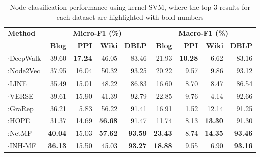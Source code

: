 \documentclass[conference]{IEEEtran}
\begin{document}
\begin{table*}[t]\small \vspace{-4pt}
\caption{Node classification performance using kernel SVM, where the top-3 results for each dataset are highlighted with bold numbers
}
\label{tbl:classifkern}
\centering
\vspace{-4pt}
\begin{tabular}{l|rrrr|rrrr}
\hline
\multirow{2}{*}{\textbf{Method}} & \multicolumn{4}{c|}{\textbf{Micro-F1 (\%)}}                                                 & \multicolumn{4}{c}{\textbf{Macro-F1 (\%)}}                                                  \\ \cline{2-9}  & \textbf{Blog}    & \textbf{PPI}            & \textbf{Wiki}           & \textbf{DBLP}           & \textbf{Blog}    & \textbf{PPI}            & \textbf{Wiki}           & \textbf{DBLP}           \\ \hline
$\cdot$DeepWalk                 & 39.60          & \textbf{17.24} & 46.05          & 83.46          & 21.93          & \textbf{10.28} & 6.62           & 83.16          \\
:Node2Vec                 & 37.95          & 16.04          & 50.32          & 93.25          & 20.22          & 9.57           & 9.86           & 93.12          \\
$\cdot$LINE                     & 35.49          & 15.01          & 48.22          & 86.83          & 16.60          & 8.70           & 8.47           & 86.54          \\
$\cdot$VERSE                    & 39.61          & 15.90          & 41.39          & 92.79          & 22.85		  & 9.76           & 4.14           & 92.66          \\ \hline
:GraRep                   & 36.21          & 5.83           & 56.22          & 91.41          & 16.91          & 1.52           & 12.14          & 91.25          \\
:HOPE                     & 31.37          & 14.69          & \textbf{56.68} 		 & 91.47          & 11.74          & 8.13           & \textbf{13.30}  & 91.30          \\
:NetMF                    & \textbf{40.04} & 15.03          & \textbf{57.62}          & \textbf{93.59} & \textbf{23.43}  & 8.74  & \textbf{14.35} & \textbf{93.46} \\ \hline
$\cdot$INH-MF                   & \textbf{36.13} & 15.50 & 45.03 & \textbf{93.27} & \textbf{18.88} & 9.55  & 6.90  & \textbf{93.16} \\ 

\end{tabular}
\end{table*}
\end{document}
